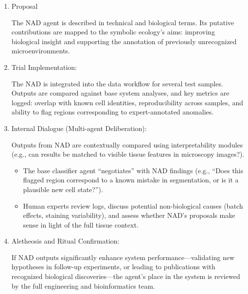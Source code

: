 \begin{enumerate}

  \item Proposal

    The NAD agent is described in technical and biological terms. Its putative
    contributions are mapped to the symbolic ecology’s aims: improving
    biological insight and supporting the annotation of previously unrecognized
    microenvironments.

  \item Trial Implementation:

    The NAD is integrated into the data workflow for several test samples.
    Outputs are compared against base system analyses, and key metrics are
    logged: overlap with known cell identities, reproducibility across samples,
    and ability to flag regions corresponding to expert-annotated anomalies.

  \item Internal Dialogue (Multi-agent Deliberation):

    Outputs from NAD are contextually compared using interpretability modules
    (e.g., can results be matched to visible tissue features in microscopy
    images?).

    \begin{itemize}

      \item The base classifier agent “negotiates” with NAD findings (e.g.,
        “Does this flagged region correspond to a known mistake in
        segmentation, or is it a plausible new cell state?”).

      \item Human experts review logs, discuss potential non-biological causes
        (batch effects, staining variability), and assess whether NAD’s
        proposals make sense in light of the full tissue context.

    \end{itemize}

  \item Aletheosis and Ritual Confirmation:

    If NAD outputs significantly enhance system performance—validating new
    hypotheses in follow-up experiments, or leading to publications with
    recognized biological discoveries—the agent's place in the system is
    reviewed by the full engineering and bioinformatics team.

  \begin{itemize}


\end{itemize}
\end{enumerate}
